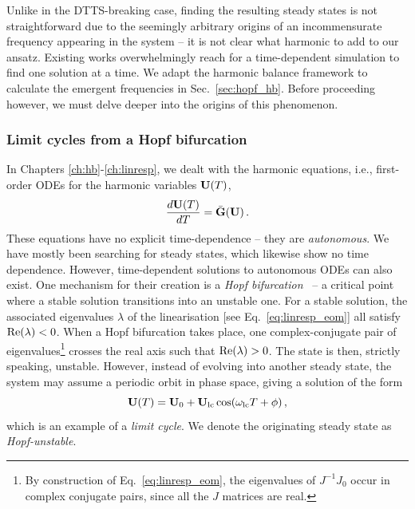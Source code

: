 Unlike in the DTTS-breaking case, finding the resulting steady states is not straightforward due to the seemingly arbitrary origins of an incommensurate frequency appearing in the system -- it is not clear what harmonic to add to our ansatz. Existing works overwhelmingly reach for a time-dependent simulation to find one solution at a time. We adapt the harmonic balance framework to calculate the emergent frequencies in Sec.~\ref{sec:hopf_hb}. Before proceeding however, we must delve deeper into the origins of this phenomenon. 

\subsubsection{Limit cycles from a Hopf bifurcation}

In Chapters \ref{ch:hb}-\ref{ch:linresp}, we dealt with the harmonic equations, i.e., first-order ODEs for the harmonic variables $\vb{U}(T)$,
\begin{equation}
\frac{d\vb{U}(T)}{dT}  = \bar{\vb{G}} (\vb{U})\,.
\end{equation}
These equations have no explicit time-dependence -- they are \textit{autonomous}. We have mostly been searching for steady states, which likewise show no time dependence. However, time-dependent solutions to autonomous ODEs can also exist. One mechanism for their creation is a \textit{Hopf bifurcation}~\cite{Jordan_Smith, Strogatz} -- a critical point where a stable solution transitions into an unstable one. For a stable solution, the associated eigenvalues $\lambda$ of the linearisation [see Eq.~\eqref{eq:linresp_eom}] all satisfy $\text{Re} (\lambda) < 0$. When a Hopf bifurcation takes place, one complex-conjugate pair of eigenvalues\footnote{By construction of Eq.~\eqref{eq:linresp_eom}, the eigenvalues of $J^{-1} J_0$ occur in complex conjugate pairs, since all the $J$ matrices are real.} crosses the real axis such that $\text{Re} (\lambda) > 0$. The state is then, strictly speaking, unstable. However, instead of evolving into another steady state, the system may assume a periodic orbit in phase space, giving a solution of the form 
\begin{equation} \label{eq:hopf_hopf}
\vb{U}(T) = \vb{U}_0 + \vb{U}_{\rm lc} \cos(\omega_{\rm lc} T + \phi ) \,,
\end{equation}
which is an example of a \textit{limit cycle}. We denote the originating steady state as \textit{Hopf-unstable}. 

